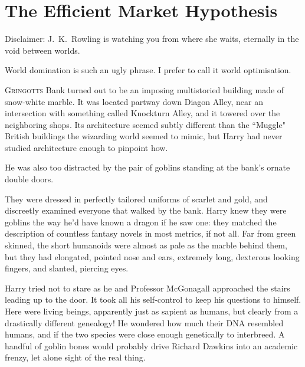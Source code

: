 \chapter[The Efficient Market Hypothesis]{The Efficient Market Hypothesis\protect\authorsnotefootnotemark}

\begin{chapterOpeningAuthorNote}
Disclaimer: J.~K.~Rowling is watching you from where she waits, eternally in the void between worlds.
\end{chapterOpeningAuthorNote}
\begin{chapterOpeningQuote}
World domination is such an ugly phrase. I prefer to call it world optimisation.
\end{chapterOpeningQuote}


\lettrine{G}{ringotts} Bank turned out to be an imposing multistoried
building made of snow-white marble. It was located
partway down Diagon Alley, near an intersection with
something called Knockturn Alley, and it towered over the
neighboring shops. Its architecture seemed subtly different
than the ``Muggle" British buildings the wizarding world
seemed to mimic, but Harry had never studied architecture
enough to pinpoint how.

He was also too distracted by the pair of goblins standing
at the bank's ornate double doors.

They were dressed in perfectly tailored uniforms of scarlet
and gold, and discreetly examined everyone that walked by
the bank. Harry knew they were goblins the way he'd
have known a dragon if he saw one: they matched the
description of countless fantasy novels in most metrics, if
not all. Far from green skinned, the short humanoids were
almost as pale as the marble behind them, but they had
elongated, pointed nose and ears, extremely long, dexterous
looking fingers, and slanted, piercing eyes.

Harry tried not to stare as he and Professor McGonagall
approached the stairs leading up to the door. It took all
his self-control to keep his questions to himself.
Here were living beings, apparently just as sapient as
humans, but clearly from a drastically different genealogy!
He wondered how much their DNA resembled humans,
and if the two species were close enough genetically to
interbreed. A handful of goblin bones would probably drive
Richard Dawkins into an academic frenzy, let alone sight of
the real thing.

